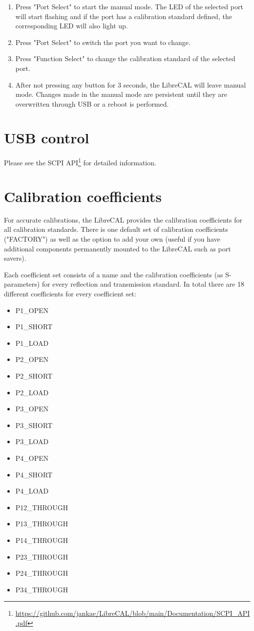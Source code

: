 \documentclass[a4paper,11pt]{article}
\newcommand{\dev}{LibreCAL}
\begin{document}
\begin{enumerate}
\item Press "Port Select" to start the manual mode. The LED of the selected port will start flashing and if the port has a calibration standard defined, the corresponding LED will also light up.
\item Press "Port Select" to switch the port you want to change.
\item Press "Function Select" to change the calibration standard of the selected port.
\item After not pressing any button for 3 seconds, the \dev{} will leave manual mode. Changes made in the manual mode are persistent until they are overwritten through USB or a reboot is performed.
\end{enumerate}

\section{USB control}
Please see the SCPI API\footnote{\url{https://github.com/jankae/LibreCAL/blob/main/Documentation/SCPI_API.pdf}} for detailed information.

\section{Calibration coefficients}
For accurate calibrations, the \dev{} provides the calibration coefficients for all calibration standards. There is one default set of calibration coefficients ("FACTORY") as well as the option to add your own (useful if you have additional components permanently mounted to the \dev{} such as port savers).

Each coefficient set consists of a name and the calibration coefficients (as S-parameters) for every reflection and transmission standard. In total there are 18 different coefficients for every coefficient set:
\begin{itemize}
\item P1\_OPEN
\item P1\_SHORT
\item P1\_LOAD
\item P2\_OPEN
\item P2\_SHORT
\item P2\_LOAD
\item P3\_OPEN
\item P3\_SHORT
\item P3\_LOAD
\item P4\_OPEN
\item P4\_SHORT
\item P4\_LOAD
\item P12\_THROUGH
\item P13\_THROUGH
\item P14\_THROUGH
\item P23\_THROUGH
\item P24\_THROUGH
\item P34\_THROUGH
\end{itemize}
\end{document}
